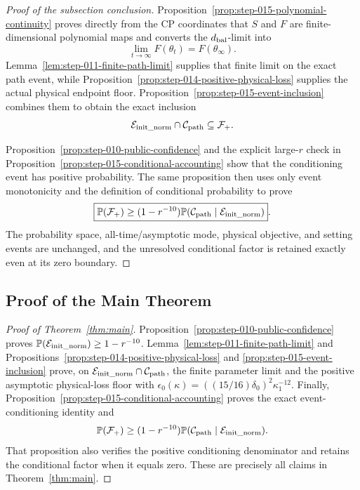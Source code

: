 \begin{proof}[Proof of the subsection conclusion]

Proposition~\ref{prop:step-015-polynomial-continuity} proves directly from
the CP coordinates that \(S\) and \(F\) are finite-dimensional polynomial
maps and converts the \(d_{\rm bal}\)-limit into
\[
  \lim_{t\to\infty}F(\theta_t)=F(\theta_\infty).
\]
Lemma~\ref{lem:step-011-finite-path-limit} supplies that finite
limit on the exact path event, while Proposition~\ref{prop:step-014-positive-physical-loss} supplies the actual
physical endpoint floor. Proposition~\ref{prop:step-015-event-inclusion}
combines them to obtain the exact inclusion
\[
  \mathcal E_{\rm init\_norm}\cap\mathcal C_{\rm path}
  \subseteq\mathcal F_+.
\]

Proposition~\ref{prop:step-010-public-confidence} and the explicit
large-\(r\) check in
Proposition~\ref{prop:step-015-conditional-accounting} show that the
conditioning event has positive probability. The same proposition then
uses only event monotonicity and the definition of conditional probability to
prove
\[
  \boxed{
  \mathbb P(\mathcal F_+)
  \ge(1-r^{-10})
    \mathbb P(\mathcal C_{\rm path}\mid
      \mathcal E_{\rm init\_norm})}.
\]
The probability space, all-time/asymptotic mode, physical objective, and
setting events are unchanged, and the unresolved conditional factor is
retained exactly even at its zero boundary.

\end{proof}

\subsection{Proof of the Main Theorem}\label{app:proof-main}

\begin{proof}[Proof of Theorem~\ref{thm:main}]
Proposition~\ref{prop:step-010-public-confidence} proves
$\mathbb P(\mathcal E_{\rm init\_norm})\geq1-r^{-10}$.
Lemma~\ref{lem:step-011-finite-path-limit} and
Propositions~\ref{prop:step-014-positive-physical-loss} and
\ref{prop:step-015-event-inclusion} prove, on
$\mathcal E_{\rm init\_norm}\cap\mathcal C_{\rm path}$,
the finite parameter limit and the positive asymptotic physical-loss floor
with $\epsilon_0(\kappa)=((15/16)\delta_0)^2\kappa_1^{-12}$.
Finally, Proposition~\ref{prop:step-015-conditional-accounting} proves the
exact event-conditioning identity and
\[
  \mathbb P(\mathcal F_+)
  \geq(1-r^{-10})
  \mathbb P(\mathcal C_{\rm path}\mid
    \mathcal E_{\rm init\_norm}).
\]
That proposition also verifies the positive conditioning denominator and
retains the conditional factor when it equals zero.  These are precisely all
claims in Theorem~\ref{thm:main}.
\end{proof}
